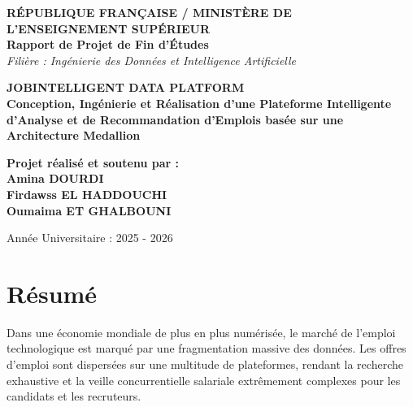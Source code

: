 \documentclass[12pt,a4paper,twoside]{report}
\begin{document}
\begin{titlepage}
    \centering
    \vspace*{1cm}
    
    {\Large \textbf{RÉPUBLIQUE FRANÇAISE / MINISTÈRE DE L'ENSEIGNEMENT SUPÉRIEUR}\\}
    \vspace{0.5cm}
    {\Large \textbf{Rapport de Projet de Fin d'Études}\\}
    \vspace{0.5cm}
    {\large \textit{Filière : Ingénierie des Données et Intelligence Artificielle}\\}
    
    \vspace{2.5cm}
    
    {\Huge \textbf{\color{blue!80!black} JOBINTELLIGENT DATA PLATFORM}\\}
    \vspace{1.5cm}
    {\LARGE \textbf{Conception, Ingénierie et Réalisation d'une Plateforme Intelligente d'Analyse et de Recommandation d'Emplois basée sur une Architecture Medallion}\\}
    \vspace{3cm}
    
    \textbf{Projet réalisé et soutenu par :}\\
    \vspace{0.8cm}
    {\Large \textbf{Amina DOURDI} \\ \textbf{Firdawss EL HADDOUCHI} \\ \textbf{Oumaima ET GHALBOUNI} \\}
    \vspace{3cm}
    
    \vfill
    
    {\large Année Universitaire : 2025 - 2026}
\end{titlepage}



\chapter*{Résumé}
Dans une économie mondiale de plus en plus numérisée, le marché de l'emploi technologique est marqué par une fragmentation massive des données. Les offres d'emploi sont dispersées sur une multitude de plateformes, rendant la recherche exhaustive et la veille concurrentielle salariale extrêmement complexes pour les candidats et les recruteurs. 
\end{document}
